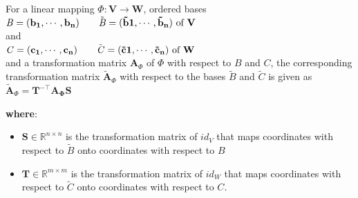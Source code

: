 \begin{theorem}\label{theorem: Basis Change}
    For a linear mapping $\Phi : \mathbf{V \to W}$, ordered bases\\ 
    \(
        \mathit{B} = \mathbf{(b_1, \cdots , b_n)} \quad\quad \tilde{\mathit{B}} = \mathbf{( \tilde{b}1, \cdots , \tilde{b}_n)}  \hfill \text{ of }\mathbf{V}
    \)\\
    and\\
    \(
        \mathit{C} = \mathbf{(c_1, \cdots , c_n)} \quad\quad \tilde{\mathit{C}} = \mathbf{( \tilde{c}1, \cdots , \tilde{c}_n)}  \hfill \text{ of }\mathbf{W}
    \)\\
    and a transformation matrix $\mathbf{A}_\Phi$ of $\Phi$ with respect to $\mathit{B}$ and $\mathit{C}$, the corresponding transformation matrix $\tilde{\mathbf{A}}_\Phi$ with respect to the bases $\tilde{\mathit{B}}$ and $\tilde{\mathit{C}}$ is given as\\
    \( \tilde{\mathbf{A}}_\Phi = \mathbf{T^{-\top} \mathbf{A}_\Phi S} \)
\end{theorem}

\vspace{0.2cm}
\noindent \textbf{where}:
\begin{itemize}
    \item $\mathbf{S} \in \mathbb{R}^{n\times n}$ is the transformation matrix of $id_V$ that maps coordinates with respect to $\tilde{\mathit{B}}$ onto coordinates with respect to $\mathit{B}$

    \item $\mathbf{T} \in \mathbb{R}^{m\times m}$ is the transformation matrix of $id_W$ that maps coordinates with respect to $\tilde{\mathit{C}}$ onto coordinates with respect to $\mathit{C}$.
\end{itemize}

